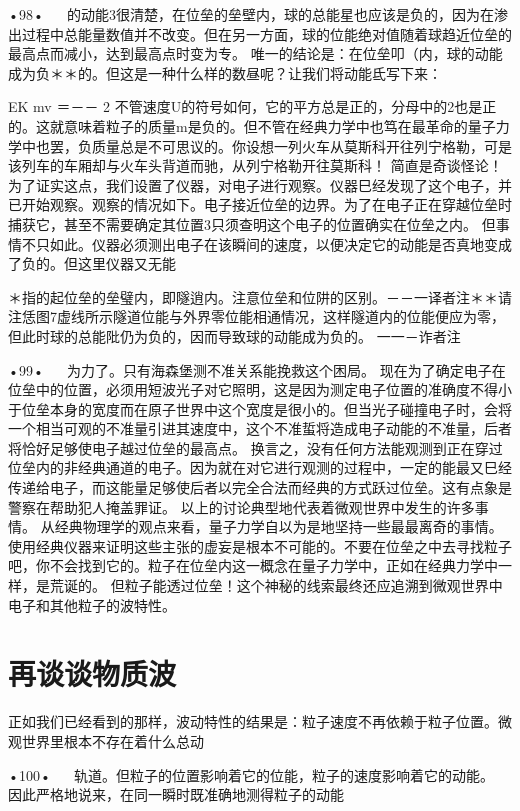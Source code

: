 •98•
  
的动能3很清楚，在位垒的垒壁内，球的总能星也应该是负的，因为在渗出过程中总能量数值并不改变。但在另一方面，球的位能绝对值随着球趋近位垒的最高点而减小，达到最高点时变为专。
唯一的结论是：在位垒叩（内，球的动能成为负＊＊的。但这是一种什么样的数昼呢？让我们将动能氐写下来：

EK
mv
＝－－
2
不管速度U的符号如何，它的平方总是正的，分母中的2也是正的。这就意味着粒子的质量m是负的。但不管在经典力学中也笃在最革命的量子力学中也罢，负质量总是不可思议的。你设想一列火车从莫斯科开往列宁格勒，可是该列车的车厢却与火车头背道而驰，从列宁格勒开往莫斯科！
简直是奇谈怪论！为了证实这点，我们设置了仪器，对电子进行观察。仪器巳经发现了这个电子，并已开始观察。观察的情况如下。电子接近位垒的边界。为了在电子正在穿越位垒时捕获它，甚至不需要确定其位置3只须查明这个电子的位置确实在位垒之内。
但事情不只如此。仪器必须测出电子在该瞬间的速度，以便决定它的动能是否真地变成了负的。但这里仪器又无能

＊指的起位垒的垒璧内，即隧逍内。注意位垒和位阱的区别。－－一译者注＊＊请注恁图7虚线所示隧道位能与外界零位能相通情况，这样隧道内的位能便应为零，但此时球的总能阰仍为负的，因而导致球的动能成为负的。
一一－诈者注

•99•
  
为力了。只有海森堡测不准关系能挽救这个困局。
现在为了确定电子在位垒中的位置，必须用短波光子对它照明，这是因为测定电子位置的准确度不得小于位垒本身的宽度而在原子世界中这个宽度是很小的。但当光子碰撞电子时，会将一个相当可观的不准量引进其速度中，这个不准蜇将造成电子动能的不准量，后者将恰好足够使电子越过位垒的最高点。
换言之，没有任何方法能观测到正在穿过位垒内的非经典通道的电子。因为就在对它进行观测的过程中，一定的能最又巳经传递给电子，而这能量足够使后者以完全合法而经典的方式跃过位垒。这有点象是警察在帮助犯人掩盖罪证。
以上的讨论典型地代表着微观世界中发生的许多事情。
从经典物理学的观点来看，量子力学自以为是地坚持一些最最离奇的事情。使用经典仪器来证明这些主张的虚妄是根本不可能的。不要在位垒之中去寻找粒子吧，你不会找到它的。粒子在位垒内这一概念在量子力学中，正如在经典力学中一样，是荒诞的。
但粒子能透过位垒！这个神秘的线索最终还应追溯到微观世界中电子和其他粒子的波特性。

\section{再谈谈物质波}

正如我们已经看到的那样，波动特性的结果是：粒子速度不再依赖于粒子位置。微观世界里根本不存在着什么总动

•100•
  
轨道。但粒子的位置影响着它的位能，粒子的速度影响着它的动能。
因此严格地说来，在同一瞬时既准确地测得粒子的动能

